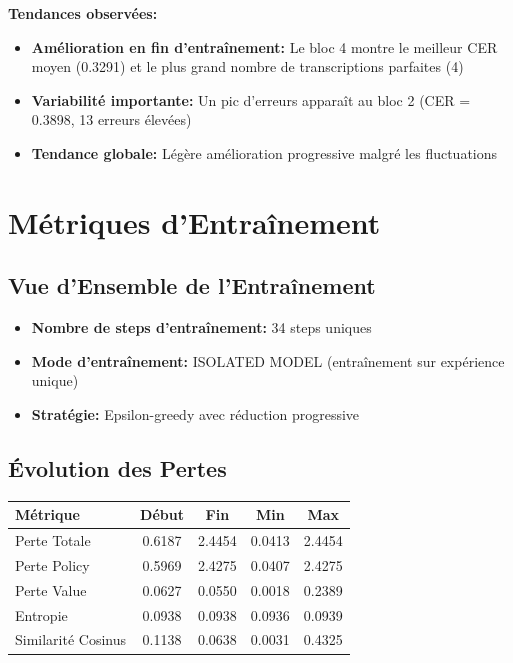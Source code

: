 \documentclass[12pt,a4paper]{article}
\begin{document}
\textbf{Tendances observées:}
\begin{itemize}
    \item \textbf{Amélioration en fin d'entraînement:} Le bloc 4 montre le meilleur CER moyen (0.3291) et le plus grand nombre de transcriptions parfaites (4)
    \item \textbf{Variabilité importante:} Un pic d'erreurs apparaît au bloc 2 (CER = 0.3898, 13 erreurs élevées)
    \item \textbf{Tendance globale:} Légère amélioration progressive malgré les fluctuations
\end{itemize}

\section{Métriques d'Entraînement}

\subsection{Vue d'Ensemble de l'Entraînement}

\begin{itemize}
    \item \textbf{Nombre de steps d'entraînement:} 34 steps uniques
    \item \textbf{Mode d'entraînement:} ISOLATED MODEL (entraînement sur expérience unique)
    \item \textbf{Stratégie:} Epsilon-greedy avec réduction progressive
\end{itemize}

\subsection{Évolution des Pertes}

\begin{center}
\begin{tabular}{|l|c|c|c|c|}
\hline
\textbf{Métrique} & \textbf{Début} & \textbf{Fin} & \textbf{Min} & \textbf{Max} \\
\hline
Perte Totale & 0.6187 & 2.4454 & 0.0413 & 2.4454 \\
Perte Policy & 0.5969 & 2.4275 & 0.0407 & 2.4275 \\
Perte Value & 0.0627 & 0.0550 & 0.0018 & 0.2389 \\
Entropie & 0.0938 & 0.0938 & 0.0936 & 0.0939 \\
Similarité Cosinus & 0.1138 & 0.0638 & 0.0031 & 0.4325 \\
\hline
\end{tabular}
\end{center}
\end{document}
